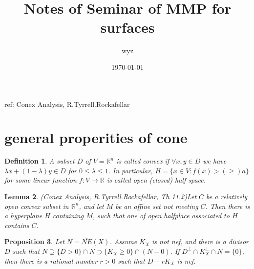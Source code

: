 \documentclass{article}
\title{Notes of Seminar of MMP for surfaces}
\author{wyz}
\date{\today}
\newtheorem{defn}{Definition}[section]
\newtheorem{prop}[defn]{Proposition}
\newtheorem{lem}[defn]{Lemma}
\begin{document}
	\maketitle

ref: Conex Analysis, R.Tyrrell.Rockafellar
\section{general properities of cone}

\begin{defn}
	A subset $ D $ of $ V=\mathbb{R}^n $ is called \emph{convex} if $ \forall x,y \in D $ we have $ \lambda x+(1-\lambda)y\in D $ for $ 0\leqslant \lambda\leqslant 1 $. 
	In particular, $ H=\{x\in V : f(x)>(\geqslant)a\} $ for some linear function $ f:V\to \mathbb{R} $ is called open (closed) half space. 
\end{defn}	

\begin{lem}
	(Conex Analysis, R.Tyrrell.Rockafellar, Th 11.2)Let $ C $ be a relatively open convex subset in $ \mathbb{R}^n $, and let $ M $ be an affine set not meeting $ C $. Then there is a hyperplane $ H $ containing $ M $, such that one of open halfplace associated to $ H $  contains $ C $.
\end{lem}

\begin{prop}
	Let $ N=\overline{NE}(X) $. Assume $ K_X $ is not nef, and there is a divisor $ D $ such that $ N\supsetneq\{D>0 \}\cap N\supset \{ K_X\geqslant 0 \}\cap (N-0) $. If $ D^\perp\cap K_X^\perp \cap N=\{0\} $, then there is a rational number $ r>0 $ such that $ D-rK_X $ is nef.
	
\end{prop}
\end{document}

